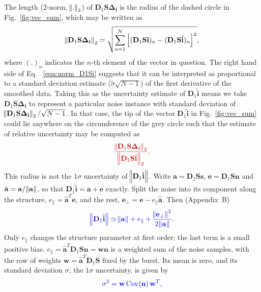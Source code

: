 \documentclass[twocolumn]{aastex631}
\providecommand{\DIFadd}[1]{{\protect\color{BLUE}#1}} %
\providecommand{\DIFdel}[1]{{\protect\color{RED}#1}} %
\providecommand{\DIFaddbegin}{} \providecommand{\DIFaddend}{} %
\providecommand{\DIFdelbegin}{} \providecommand{\DIFdelend}{} %
\newcommand{\DIFscaledelfig}{0.5}
\newlength{\DIFdelgraphicswidth} %
\newlength{\DIFdelgraphicsheight} %
\newcommand{\DIFaddincludegraphics}[2][]{{\color{blue}\fbox{\DIFOincludegraphics[#1]{#2}}}} %
\newcommand{\DIFdelincludegraphics}[2][]{%
\sbox{\DIFdelgraphicsbox}{\DIFOincludegraphics[#1]{#2}}%
\settoboxwidth{\DIFdelgraphicswidth}{\DIFdelgraphicsbox} %
\settoboxtotalheight{\DIFdelgraphicsheight}{\DIFdelgraphicsbox} %
\scalebox{\DIFscaledelfig}{%
\parbox[b]{\DIFdelgraphicswidth}{\usebox{\DIFdelgraphicsbox}\\[-\baselineskip] \rule{\DIFdelgraphicswidth}{0em}}\llap{\resizebox{\DIFdelgraphicswidth}{\DIFdelgraphicsheight}{%
\setlength{\unitlength}{\DIFdelgraphicswidth}%
\begin{picture}(1,1)%
\thicklines\linethickness{2pt} %
{\color[rgb]{1,0,0}\put(0,0){\framebox(1,1){}}}%
{\color[rgb]{1,0,0}\put(0,0){\line( 1,1){1}}}%
{\color[rgb]{1,0,0}\put(0,1){\line(1,-1){1}}}%
\end{picture}%
}\hspace*{3pt}}} %
} %
\DeclareRobustCommand{\DIFaddbegin}{\DIFOaddbegin \let\includegraphics\DIFaddincludegraphics} %
\DeclareRobustCommand{\DIFaddend}{\DIFOaddend \let\includegraphics\DIFOincludegraphics} %
\DeclareRobustCommand{\DIFdelbegin}{\DIFOdelbegin \let\includegraphics\DIFdelincludegraphics} %
\DeclareRobustCommand{\DIFdelend}{\DIFOaddend \let\includegraphics\DIFOincludegraphics} %
\begin{document}
The length (2-norm, $\norm{.}_2$) of $\mathbf{D}_1\mathbf{S}\mathbf{\Delta_i}$ is the radius of the dashed circle in Fig.~\ref{fig:vec_sum}, which may be written as 
\begin{eqnarray}
\norm{\mathbf{D}_1\mathbf{S}\mathbf{\Delta_i}}_2=\sqrt{\sum_{n=1}^N \left[(\mathbf{D}_1\mathbf{S}\mathbf{i})_n-(\mathbf{D}_1\mathbf{S}\tilde{\mathbf{i}})_n\right]^2},
\label{eqn:norm_D1Si}
\end{eqnarray}
where $(.)_n$ indicates the $n$-th element of the vector in question. \DIFdelbegin \DIFdel{The right hand side of Eq. ~\eqref{eqn:norm_D1Si} suggests that it can be interpreted as proportional to a standard deviation estimate ($\tilde{\sigma}\sqrt{N-1}$)
of the first derivative of the smoothed data. Taking this as the uncertainty estimate of $\mathbf{D}_1\tilde{\mathbf{i}}$ means we take $\mathbf{D}_1\mathbf{S}\mathbf{\Delta_i}$ to represent a particular noise instance with standard deviation of $\norm{\mathbf{D}_1\mathbf{S}\mathbf{\Delta_i}}_2/\sqrt{N-1}$. In that case, the tip of the vector $\mathbf{D}_1\tilde{\mathbf{i}}$  in Fig.~\ref{fig:vec_sum} could lie anywhere on the circumference of the grey circle such that the estimate of relative uncertainty may be computed as
}\begin{eqnarray*}
\DIFdel{\frac{\norm{\mathbf{D}_1\mathbf{S}\mathbf{\Delta_i}}_2}{\norm{\mathbf{D}_1\mathbf{S}\tilde{\mathbf{i}}}_2}.
\label{eqn:rel_error}
}\end{eqnarray*}%
\DIFdelend \DIFaddbegin \DIFadd{This radius is not the $1\sigma$ uncertainty of $\norm{\mathbf{D}_1\tilde{\mathbf{i}}}$. Write $\mathbf{a}=\mathbf{D}_1\mathbf{S}\mathbf{s}$, $\mathbf{e}=\mathbf{D}_1\mathbf{S}\mathbf{n}$ and $\hat{\mathbf{a}}=\mathbf{a}/\norm{\mathbf{a}}$, so that $\mathbf{D}_1\tilde{\mathbf{i}}=\mathbf{a}+\mathbf{e}$ exactly. Split the noise into its component along the structure, $e_\parallel=\hat{\mathbf{a}}^T\mathbf{e}$, and the rest, $\mathbf{e}_\perp=\mathbf{e}-e_\parallel\hat{\mathbf{a}}$. Then (Appendix~B)
}\begin{eqnarray}
\DIFadd{\norm{\mathbf{D}_1\tilde{\mathbf{i}}}\simeq\norm{\mathbf{a}}+e_\parallel+\frac{\norm{\mathbf{e}_\perp}^2}{2\norm{\mathbf{a}}}.
\label{eqn:expand}
}\end{eqnarray}
\DIFadd{Only $e_\parallel$ changes the structure parameter at first order; the last term is a small positive bias. $e_\parallel=\hat{\mathbf{a}}^T\mathbf{D}_1\mathbf{S}\mathbf{n}=\mathbf{w}\mathbf{n}$ is a weighted sum of the noise samples, with the row of weights $\mathbf{w}=\hat{\mathbf{a}}^T\mathbf{D}_1\mathbf{S}$ fixed by the burst. Its mean is zero, and its standard deviation $\sigma$, the $1\sigma$ uncertainty, is given by
}\begin{eqnarray}
\DIFadd{\sigma^2=\mathbf{w}\,{\rm Cov}(\mathbf{n})\,\mathbf{w}^T,
\label{eqn:sigma}
}\end{eqnarray}
\end{document}
